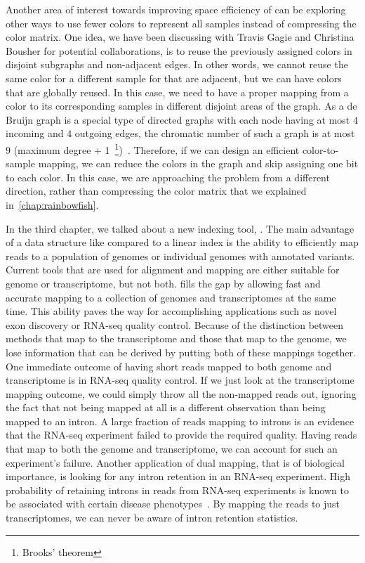 Another area of interest towards improving space efficiency of \cdbgs can be exploring other ways to use fewer colors to represent all samples instead of compressing the color matrix. One idea, we have been discussing with Travis Gagie and Christina Bousher for potential collaborations, is to reuse the previously assigned colors in disjoint subgraphs and non-adjacent edges. In other words, we cannot reuse the same color for a different sample for \kmers that are adjacent, but we can have colors that are globally reused. In this case, we need to have a proper mapping from a color to its corresponding samples in different disjoint areas of the graph. As a de Bruijn graph is a special type of directed graphs with each node having at most $4$ incoming and $4$ outgoing edges, the chromatic number of such a graph is at most $9$ (maximum degree + 1~\footnote{Brooks' theorem})~\cite{cranston2015brooks}. Therefore, if we can design an efficient color-to-sample mapping, we can reduce the colors in the graph and skip assigning one bit to each color. In this case, we are approaching the problem from a different direction, rather than compressing the color matrix that we explained in~\ref{chap:rainbowfish}.

In the third chapter, we talked about a new indexing tool, \pufferfish. The main advantage of a data structure like \pufferfish compared to a linear index is the ability to efficiently map reads to a population of genomes or individual genomes with annotated variants. Current tools that are used for alignment and mapping are either suitable for genome or transcriptome, but not both. \pufferfish fills the gap by allowing fast and accurate mapping to a collection of genomes and transcriptomes at the same time. This ability paves the way for accomplishing applications such as novel exon discovery or RNA-seq quality control. 
Because of the distinction between methods that map to the transcriptome and those that map to the genome, we lose information that can be derived by putting both of these mappings together. One immediate outcome of having short reads mapped to both genome and transcriptome is in RNA-seq quality control. If we just look at the transcriptome mapping outcome, we could simply throw all the non-mapped reads out, ignoring the fact that not being mapped at all is a different observation than being mapped to an intron. A large fraction of reads mapping to introns is an evidence that the RNA-seq experiment failed to provide the required quality. Having reads that map to both the genome and transcriptome, we can account for such an experiment's failure. Another application of dual mapping, that is of biological importance, is looking for any intron retention in an RNA-seq experiment. High probability of retaining introns in reads from RNA-seq experiments is known to be associated with certain disease phenotypes~\cite{faustino2003pre,tazi2009alternative}. By mapping the reads to just transcriptomes, we can never be aware of intron retention statistics.


